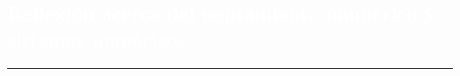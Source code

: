 \pagecolor{white}
\pagestyle{eimat}
\begin{titlepage}
\pagecolor{white}
\newcommand{\R}{\ensuremath{\mathbb{R}}}
\BgThispage
{}
\vspace*{-1.1cm}
\noindent
\def\titulo#1{\section{#1}}

\section{\bf\large\textcolor{white}{Reflexi\'{o}n acerca del pensamiento mum\'erico y sistemas num\'ericos}}
\vspace*{2cm}\par
\noindent

\begin{minipage}{0.5\linewidth}
\begin{minipage}{0.45\linewidth}
    \begin{flushright}
        \printauthor
    \end{flushright}
\end{minipage} \hspace{-3pt}
%
\begin{minipage}{0.02\linewidth}
   \color{ptctitle} \rule{1pt}{245pt}
\end{minipage} 
\end{minipage}
\hspace*{-4.5cm}
\begin{minipage}{0.85\linewidth}
\begin{minipage}{0.85\linewidth}
\footnotesize
\vspace{5pt}
    \begin{resumen}
    

\end{resumen}
\end{minipage}
\end{minipage}
\end{titlepage}
